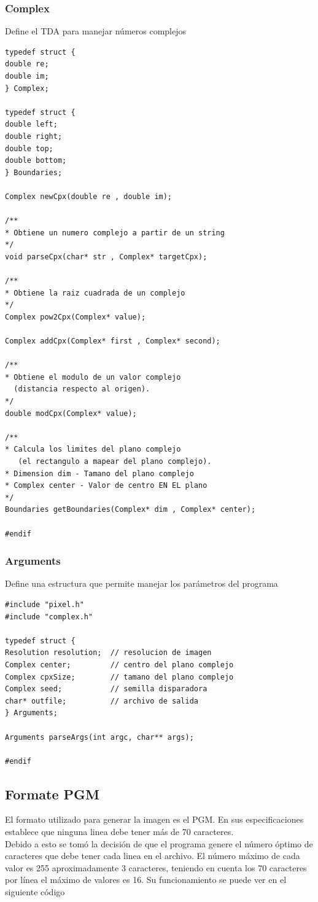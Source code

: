 \documentclass [12pt, a4paper]{article}
\begin{document}
	\subsubsection{\textbf{Complex}}
		Define el TDA para manejar números complejos
	\begin{lstlisting}[frame=single]
typedef struct {
double re;
double im;
} Complex;

typedef struct {
double left;
double right;
double top;
double bottom;
} Boundaries;

Complex newCpx(double re , double im);

/** 
* Obtiene un numero complejo a partir de un string
*/
void parseCpx(char* str , Complex* targetCpx);

/**
* Obtiene la raiz cuadrada de un complejo
*/
Complex pow2Cpx(Complex* value);

Complex addCpx(Complex* first , Complex* second);

/** 
* Obtiene el modulo de un valor complejo 
  (distancia respecto al origen).
*/
double modCpx(Complex* value);

/** 
* Calcula los limites del plano complejo 
   (el rectangulo a mapear del plano complejo).
* Dimension dim - Tamano del plano complejo
* Complex center - Valor de centro EN EL plano
*/
Boundaries getBoundaries(Complex* dim , Complex* center);

#endif

	\end{lstlisting}
	
\subsubsection{\textbf{Arguments}}
Define una estructura que permite manejar los parámetros del programa
\begin{lstlisting}[frame=single]
#include "pixel.h"
#include "complex.h"

typedef struct {
Resolution resolution;  // resolucion de imagen
Complex center;         // centro del plano complejo
Complex cpxSize;        // tamano del plano complejo
Complex seed;           // semilla disparadora
char* outfile;          // archivo de salida
} Arguments;

Arguments parseArgs(int argc, char** args);

#endif

\end{lstlisting}
	
\subsection{Formate PGM}
	El formato utilizado para generar la imagen es el PGM. En sus especificaciones establece que ninguna linea debe tener más de 70 caracteres.\\Debido a esto se tomó la decisión de que el programa genere el número óptimo de caracteres que debe tener cada linea en el archivo. El número máximo de cada valor es 255 aproximadamente 3 caracteres, teniendo en cuenta los 70 caracteres por línea el máximo de valores es 16. Su funcionamiento se puede ver en el siguiente código 
	
\end{document}

